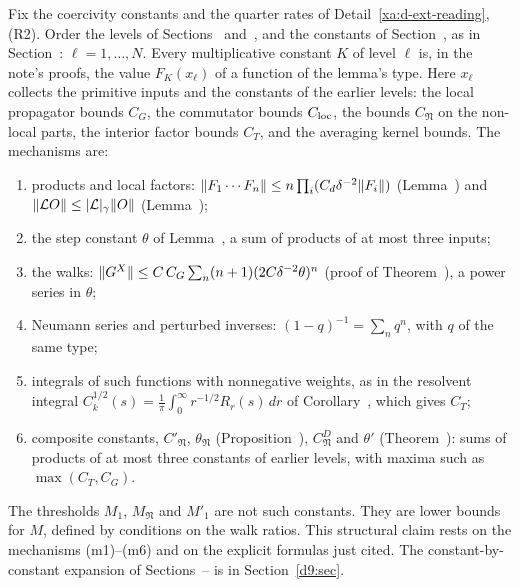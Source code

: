 \begin{detail}
\begin{step}
Fix the coercivity constants and the quarter rates of Detail~\ref{xa:d-ext-reading}, (R2). Order the levels of Sections~ and~, and the constants of Section~, as in Section~: $\ell=1,\dots,N$. Every multiplicative constant $K$ of level $\ell$ is, in the note's proofs, the value $F_K(x_\ell)$ of a function of the lemma's type. Here $x_\ell$ collects the primitive inputs and the constants of the earlier levels: the local propagator bounds $C_G$, the commutator bounds $C_{\rm loc}$, the bounds $C_{\mathfrak N}$ on the non-local parts, the interior factor bounds $C_T$, and the averaging kernel bounds. The mechanisms are:
\begin{enumerate}[label=(m\arabic*)]
\item products and local factors: $\lVert F_1\cdots F_n\rVert\le n\prod_i(C_d\delta^{-2}\lVert F_i\rVert)$ (Lemma~) and $\lVert\mathcal LO\rVert\le\lvert\mathcal L\rvert_\gamma\lVert O\rVert$ (Lemma~);
\item the step constant $\theta$ of Lemma~, a sum of products of at most three inputs;
\item the walks: $\lVert G^X\rVert\le C\,C_G\sum_n(n+1)(2C\delta^{-2}\theta)^n$ (proof of Theorem~), a power series in $\theta$;
\item Neumann series and perturbed inverses: $(1-q)^{-1}=\sum_nq^n$, with $q$ of the same type;
\item integrals of such functions with nonnegative weights, as in the resolvent integral $C_k^{1/2}(s)=\frac1\pi\int_0^\infty r^{-1/2}R_r(s)\,dr$ of Corollary~, which gives $C_T$;
\item composite constants, $C'_{\mathfrak N}$, $\theta_{\mathfrak N}$ (Proposition~), $C^D_{\mathfrak N}$ and $\theta'$ (Theorem~): sums of products of at most three constants of earlier levels, with maxima such as $\max(C_T,C_G)$.
\end{enumerate}
The thresholds $M_1$, $M_{\mathfrak N}$ and $M'_1$ are not such constants. They are lower bounds for $M$, defined by conditions on the walk ratios. This structural claim rests on the mechanisms (m1)--(m6) and on the explicit formulas just cited. The constant-by-constant expansion of Sections~-- is in Section~\ref{d9:sec}.


\end{step}
\end{detail}
